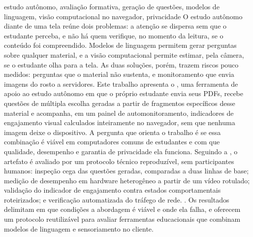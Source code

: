\begin{resumo}{estudo autônomo, avaliação formativa, geração de questões, modelos de linguagem, visão computacional no navegador, privacidade}
O estudo autônomo diante de uma tela reúne dois problemas: a atenção se dispersa sem que o estudante perceba, e não há quem verifique, no momento da leitura, se o conteúdo foi compreendido. Modelos de linguagem permitem gerar perguntas sobre qualquer material, e a visão computacional permite estimar, pela câmera, se o estudante olha para a tela. As duas soluções, porém, trazem riscos pouco medidos: perguntas que o material não sustenta, e monitoramento que envia imagens do rosto a servidores. Este trabalho apresenta o \ferramenta, uma ferramenta de apoio ao estudo autônomo em que o próprio estudante envia seus PDFs, recebe questões de múltipla escolha geradas a partir de fragmentos específicos desse material e acompanha, em um painel de automonitoramento, indicadores de engajamento visual calculados inteiramente no navegador, sem que nenhuma imagem deixe o dispositivo. A pergunta que orienta o trabalho é se essa combinação é viável em computadores comuns de estudantes e com que qualidade, desempenho e garantia de privacidade ela funciona. Seguindo a , o artefato é avaliado por um protocolo técnico reproduzível, sem participantes humanos: inspeção cega das questões geradas, comparadas a duas linhas de base; medição de desempenho em hardware heterogêneo a partir de um vídeo rotulado; validação do indicador de engajamento contra estados comportamentais roteirizados; e verificação automatizada do tráfego de rede. . Os resultados delimitam em que condições a abordagem é viável e onde ela falha, e oferecem um protocolo reutilizável para avaliar ferramentas educacionais que combinam modelos de linguagem e sensoriamento no cliente.
\end{resumo}


